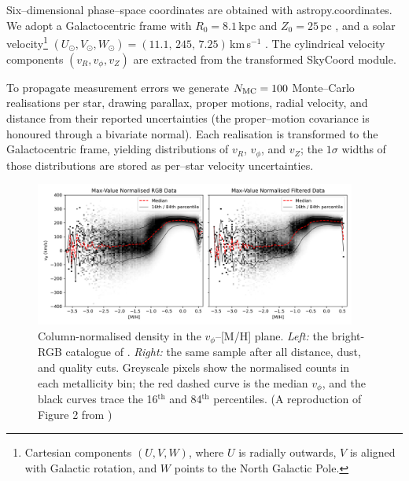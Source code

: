\documentclass[a4paper,12pt]{article}
\begin{document}
Six–dimensional phase–space coordinates are obtained with
astropy.coordinates.  We adopt a Galactocentric frame
with $R_{0}=8.1$\,kpc and $Z_{0}=25$\,pc \citep{McMillan2016}, and a solar
velocity\footnote{Cartesian components $(U,V,W)$, where $U$ is radially
outwards, $V$ is aligned with Galactic rotation, and $W$ points to the
North Galactic Pole.}
$(U_{\odot},V_{\odot},W_{\odot})=(11.1,\,245,\,7.25)$\,km\,s$^{-1}$
\citep{Schonrich2010}.
The cylindrical velocity components
$(v_{R},v_{\phi},v_{Z})$ are extracted from the transformed
SkyCoord module.

To propagate measurement errors we generate
$N_{\rm MC}=100$ Monte–Carlo realisations per star, drawing
parallax, proper motions, radial velocity, and distance from their
reported uncertainties (the proper–motion covariance is honoured
through a bivariate normal).  Each realisation is transformed to the
Galactocentric frame, yielding distributions of
$v_{R}$, $v_{\phi}$, and $v_{Z}$; the $1\sigma$ widths of those
distributions are stored as per–star velocity uncertainties.




\begin{figure}
  \centering
  \includegraphics[width=0.94\textwidth]{../figures/vphi_histograms_with_tracks.png}
  \caption{Column-normalised density in the $v_{\phi}$–[M/H] plane.
           \textit{Left:} the bright-RGB catalogue of \citet{Andrae2023}.
           \textit{Right:} the same sample after all distance,
           dust, and quality cuts.  Greyscale pixels show the normalised
           counts in each metallicity bin; the red dashed curve is the
           median $v_{\phi}$, and the black curves trace the 16$^{\text{th}}$
           and 84$^{\text{th}}$ percentiles.
           (A reproduction of Figure 2 from \citet{zhang2024existencemetalpoordiscmilky})}
  \label{fig:vphi_tracks}
\end{figure}
\end{document}
